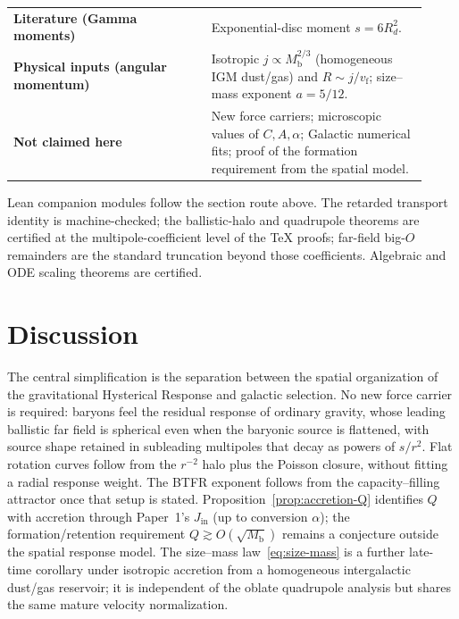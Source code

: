 \documentclass[11pt]{article}
\theoremstyle{definition}
\theoremstyle{remark}
\newcommand{\Mb}{M_{\mathrm{b}}}
\newcommand{\vf}{v_{\mathrm{f}}}
\begin{document}
\begin{center}
\begin{tabular}{@{}p{0.44\linewidth}p{0.48\linewidth}@{}}
\textbf{Literature (Gamma moments)} & Exponential-disc moment $s=6R_{d}^{2}$.\\
\textbf{Physical inputs (angular momentum)} & Isotropic $j\propto\Mb^{2/3}$ (homogeneous IGM dust/gas) and $R\sim j/\vf$; size--mass exponent $a=5/12$.\\
\textbf{Not claimed here} & New force carriers; microscopic values of $C,A,\alpha$; Galactic numerical fits; proof of the formation requirement from the spatial model.\\
\bottomrule
\end{tabular}
\end{center}

Lean companion modules follow the section route above.
The retarded transport identity is machine-checked; the ballistic-halo and quadrupole theorems are certified at the multipole-coefficient level of the TeX proofs; far-field big-$O$ remainders are the standard truncation beyond those coefficients. Algebraic and ODE scaling theorems are certified.


\section{Discussion}
\label{sec:discussion}
The central simplification is the separation between the spatial organization of the gravitational Hysterical Response and galactic selection.
No new force carrier is required: baryons feel the residual response of ordinary gravity, whose leading ballistic far field is spherical even when the baryonic source is flattened, with source shape retained in subleading multipoles that decay as powers of $s/r^{2}$.
Flat rotation curves follow from the $r^{-2}$ halo plus the Poisson closure, without fitting a radial response weight.
The BTFR exponent follows from the capacity--filling attractor once that setup is stated.
Proposition~\ref{prop:accretion-Q} identifies $Q$ with accretion through Paper~1's $J_{\mathrm{in}}$ (up to conversion $\alpha$); the formation/retention requirement $\boxed{Q\gtrsim O(\sqrt{\Mb})}$ remains a conjecture outside the spatial response model.
The size--mass law~\eqref{eq:size-mass} is a further late-time corollary under isotropic accretion from a homogeneous intergalactic dust/gas reservoir; it is independent of the oblate quadrupole analysis but shares the same mature velocity normalization.
\end{document}
